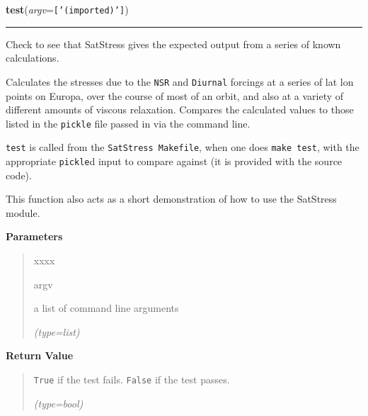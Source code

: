 \hspace{.8\funcindent}\begin{boxedminipage}{\funcwidth}

    \raggedright \textbf{test}(\textit{argv}={\tt \texttt{[}\texttt{'}\texttt{(imported)}\texttt{'}\texttt{]}})

    \vspace{-1.5ex}

    \rule{\textwidth}{0.5\fboxrule}
\setlength{\parskip}{2ex}
    Check to see that SatStress gives the expected output from a series of 
    known calculations.

    Calculates the stresses due to the \texttt{NSR} and \texttt{Diurnal} 
    forcings at a series of lat lon points on Europa, over the course of 
    most of an orbit, and also at a variety of different amounts of viscous
    relaxation.  Compares the calculated values to those listed in the 
    \texttt{pickle} file passed in via the command line.

    \texttt{test} is called from the \texttt{SatStress Makefile}, when one 
    does \texttt{make test}, with the appropriate \texttt{pickle}d input to
    compare against (it is provided with the source code).

    This function also acts as a short demonstration of how to use the 
    SatStress module.

\setlength{\parskip}{1ex}
      \textbf{Parameters}
      \vspace{-1ex}

      \begin{quote}
        \begin{Ventry}{xxxx}

          \item[argv]

          a list of command line arguments

            {\it (type=list)}

        \end{Ventry}

      \end{quote}

      \textbf{Return Value}
    \vspace{-1ex}

      \begin{quote}
      \texttt{True} if the test fails. \texttt{False} if the test passes.

      {\it (type=bool)}

      \end{quote}

    \end{boxedminipage}



